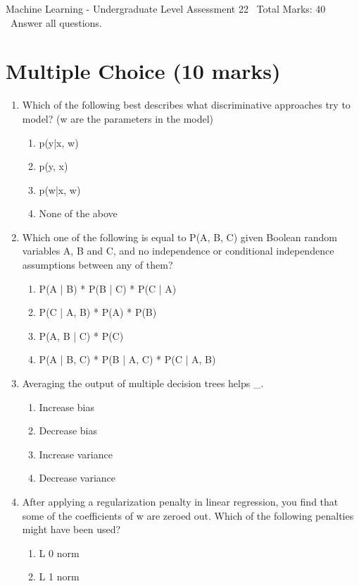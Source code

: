 \documentclass[12pt]{article}
\begin{document}
\begin{center}
Machine Learning - Undergraduate Level Assessment 22 \
Total Marks: 40 \
Answer all questions.
\end{center}

\section*{Multiple Choice (10 marks)}
\begin{enumerate}[label=\arabic*.]
\item Which of the following best describes what discriminative approaches try to model? (w are the parameters in the model)
\begin{enumerate}[label=(\alph*)]
    \item p(y|x, w)
    \item p(y, x)
    \item p(w|x, w)
    \item None of the above
\end{enumerate}
\item Which one of the following is equal to P(A, B, C) given Boolean random variables A, B and C, and no independence or conditional independence assumptions between any of them?
\begin{enumerate}[label=(\alph*)]
    \item P(A | B) * P(B | C) * P(C | A)
    \item P(C | A, B) * P(A) * P(B)
    \item P(A, B | C) * P(C)
    \item P(A | B, C) * P(B | A, C) * P(C | A, B)
\end{enumerate}
\item Averaging the output of multiple decision trees helps \_.
\begin{enumerate}[label=(\alph*)]
    \item Increase bias
    \item Decrease bias
    \item Increase variance
    \item Decrease variance
\end{enumerate}
\item After applying a regularization penalty in linear regression, you find that some of the coefficients of w are zeroed out. Which of the following penalties might have been used?
\begin{enumerate}[label=(\alph*)]
    \item L 0 norm
    \item L 1 norm

\end{enumerate}
\end{enumerate}
\end{document}
